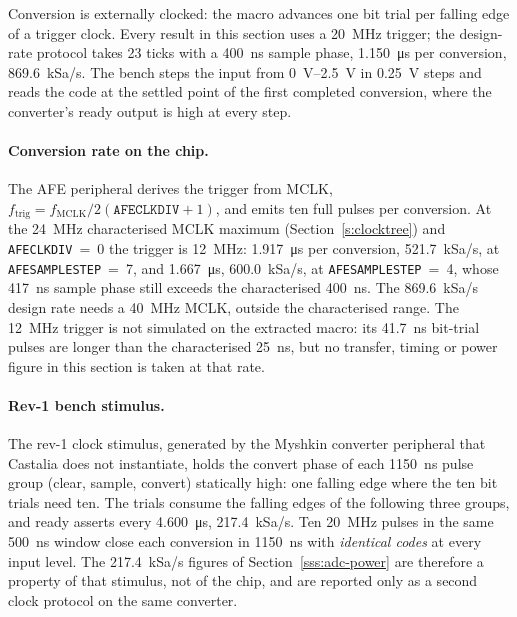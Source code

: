 Conversion is externally clocked: the macro advances one bit trial per falling
edge of a trigger clock. Every result in this section uses a
\SI{20}{\mega\hertz} trigger; the design-rate protocol takes 23 ticks with a
\SI{400}{\nano\second} sample phase, \SI{1.150}{\micro\second} per
conversion, \SI{869.6}{kSa/s}. The bench steps
the input from \SIrange{0}{2.5}{\volt} in \SI{0.25}{\volt} steps and reads the
code at the settled point of the first completed conversion, where the
converter's ready output is high at every step.

\paragraph{Conversion rate on the chip.} The AFE peripheral derives the trigger
from MCLK, \(f_{\mathrm{trig}} = f_{\mathrm{MCLK}}/2(\texttt{AFECLKDIV}+1)\), and
emits ten full pulses per conversion. At the \SI{24}{\mega\hertz} characterised
MCLK maximum (Section~\ref{s:clocktree}) and \texttt{AFECLKDIV}~=~0 the trigger
is \SI{12}{\mega\hertz}: \SI{1.917}{\micro\second} per conversion,
\SI{521.7}{kSa/s}, at \texttt{AFESAMPLESTEP}~=~7, and
\SI{1.667}{\micro\second}, \SI{600.0}{kSa/s}, at \texttt{AFESAMPLESTEP}~=~4,
whose \SI{417}{\nano\second} sample phase still exceeds the characterised
\SI{400}{\nano\second}. The \SI{869.6}{kSa/s} design rate needs a
\SI{40}{\mega\hertz} MCLK, outside the characterised range. The
\SI{12}{\mega\hertz} trigger is not simulated on the extracted macro: its
\SI{41.7}{\nano\second} bit-trial pulses are longer than the characterised
\SI{25}{\nano\second}, but no transfer, timing or power figure in this section
is taken at that rate.

\paragraph{Rev-1 bench stimulus.} The rev-1 clock stimulus, generated by the
Myshkin converter peripheral that Castalia does not instantiate, holds the
convert phase of each \SI{1150}{\nano\second} pulse group (clear, sample,
convert) statically high: one falling edge where the ten bit trials need ten.
The trials consume the falling edges of the following three groups, and ready
asserts every \SI{4.600}{\micro\second}, \SI{217.4}{kSa/s}. Ten
\SI{20}{\mega\hertz} pulses in the same \SI{500}{\nano\second} window close
each conversion in \SI{1150}{\nano\second} with \emph{identical codes} at every
input level. The \SI{217.4}{kSa/s} figures of Section~\ref{sss:adc-power} are
therefore a property of that stimulus, not of the chip, and are reported only as
a second clock protocol on the same converter.


